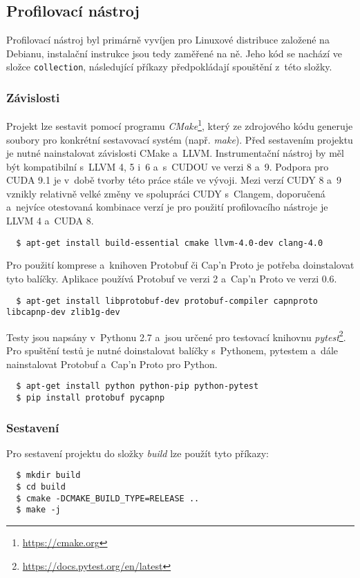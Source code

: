 \subsection{Profilovací nástroj}
Profilovací nástroj byl primárně vyvíjen pro Linuxové distribuce založené na Debianu, instalační instrukce jsou tedy zaměřené na ně. Jeho kód se nachází ve složce \texttt{collection}, následující příkazy předpokládají spouštění z~této složky. 

\subsubsection{Závislosti}
Projekt lze sestavit pomocí programu \emph{CMake}\footnote{\url{https://cmake.org}}, který ze zdrojového kódu generuje soubory pro konkrétní sestavovací systém (např. \emph{make}). Před sestavením projektu je nutné nainstalovat závislosti CMake a~LLVM. Instrumentační nástroj by měl být kompatibilní s~LLVM 4, 5 i~6 a~s~CUDOU ve verzi 8 a~9. Podpora pro CUDA 9.1 je v~době tvorby této práce stále ve vývoji.
Mezi verzí CUDY 8 a~9 vznikly relativně velké změny ve spolupráci CUDY s~Clangem, doporučená a~nejvíce otestovaná kombinace verzí je pro použití profilovacího nástroje je LLVM 4 a~CUDA 8.
\begin{verbatim}
  $ apt-get install build-essential cmake llvm-4.0-dev clang-4.0
\end{verbatim}
Pro použití komprese a~knihoven Protobuf či Cap'n Proto je potřeba doinstalovat tyto balíčky. Aplikace používá Protobuf ve verzi 2 a~Cap'n Proto ve verzi 0.6.
\begin{verbatim}
  $ apt-get install libprotobuf-dev protobuf-compiler capnproto libcapnp-dev zlib1g-dev
\end{verbatim}
Testy jsou napsány v~Pythonu 2.7 a~jsou určené pro testovací knihovnu \emph{pytest}\footnote{\url{https://docs.pytest.org/en/latest}}. Pro spuštění testů je nutné doinstalovat balíčky s~Pythonem, pytestem a~dále nainstalovat Protobuf a~Cap'n Proto pro Python.
\begin{verbatim}
  $ apt-get install python python-pip python-pytest
  $ pip install protobuf pycapnp
\end{verbatim}

\subsubsection{Sestavení}
Pro sestavení projektu do složky \emph{build} lze použít tyto příkazy:

\noindent
\begin{minipage}{\textwidth}
	\begin{verbatim}
  $ mkdir build
  $ cd build
  $ cmake -DCMAKE_BUILD_TYPE=RELEASE ..
  $ make -j
	\end{verbatim}
\end{minipage}

